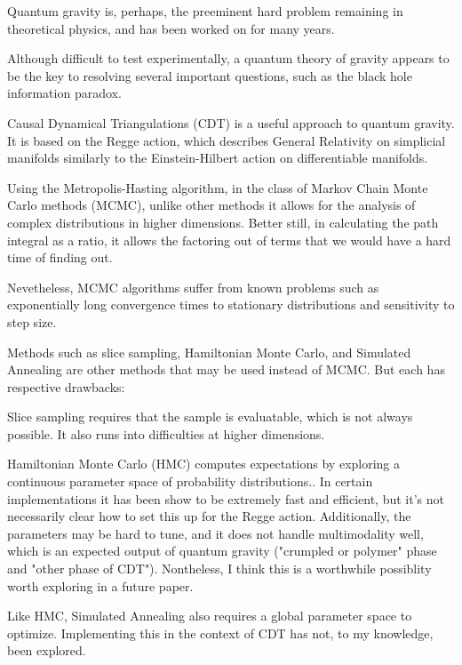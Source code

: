 \documentclass[12pt]{article}
\begin{document}
Quantum gravity is, perhaps, the preeminent hard problem\cite{steve_carlip_why_2014} remaining in theoretical physics, and has been worked on for many years\cite{rovelli_notes_2000}.

Although difficult to test experimentally, a quantum theory of gravity appears to be the key to resolving several important
questions, such as the black hole information paradox.\cite{preskill_black_1992}

Causal Dynamical Triangulations (CDT) \cite{j._ambjorn_dynamically_2001} is a useful approach to
quantum gravity. It is based on the Regge action\cite{regge_general_1961}, which describes General Relativity on simplicial manifolds similarly to the Einstein-Hilbert action on differentiable manifolds.

Using the Metropolis-Hasting algorithm, in the class of Markov Chain Monte Carlo methods (MCMC), unlike other methods it allows
for the analysis of complex distributions in higher dimensions. Better still, in calculating the path integral as a ratio, it allows
the factoring out of terms that we would have a hard time of finding out.

Nevetheless, MCMC algorithms suffer from known problems such as exponentially long convergence times to stationary distributions and sensitivity to step size.

Methods such as slice sampling, Hamiltonian Monte Carlo, and Simulated Annealing are other methods that may be used instead of MCMC.
But each has respective drawbacks:

Slice sampling requires that the sample is evaluatable, which is not always possible. It also runs into difficulties at higher dimensions.

Hamiltonian Monte Carlo (HMC) computes expectations by exploring a continuous parameter space of probability distributions.\cite{betancourt_conceptual_2017}. In certain implementations
it has been show to be extremely fast and efficient\cite{hoffman_no-u-turn_2011}, but it's not necessarily clear how to set this up for the Regge action. Additionally, the parameters may be hard to tune, and it does not handle multimodality well, which is an expected output of quantum gravity ("crumpled or polymer" phase and "other phase of CDT"). Nontheless, I think this is a worthwhile possiblity worth exploring in a future paper.

Like HMC, Simulated Annealing also requires a global parameter space to optimize.\cite{busetti_simulated_nodate} Implementing this in the context of CDT has not, to my knowledge, been explored.
\end{document}
